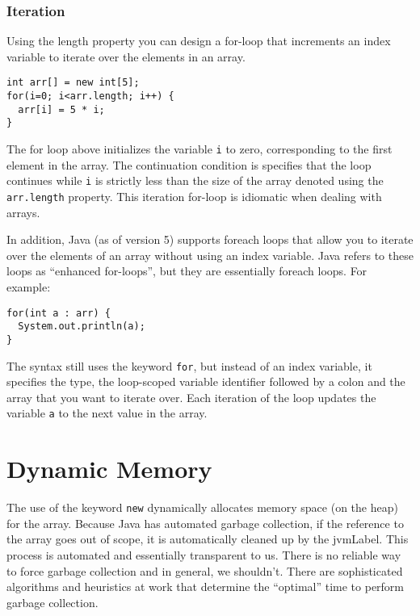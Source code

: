 \subsubsection{Iteration}

Using the length property you can design a for-loop that
increments an index variable to iterate over the elements in
an array.

\begin{verbatim}
int arr[] = new int[5];
for(i=0; i<arr.length; i++) {
  arr[i] = 5 * i;
}
\end{verbatim}

The for loop above initializes the variable \texttt{i} to zero,
corresponding to the first element in the array.  The continuation
condition is specifies that the loop continues while \texttt{i}
is strictly less than the size of the array denoted using the
\texttt{arr.length} property.  This iteration for-loop
is idiomatic when dealing with arrays.

In addition, Java (as of version 5) supports foreach loops that 
allow you to iterate over the elements of an array without using
an index variable.  Java refers to these loops as ``enhanced
for-loops'', but they are essentially foreach loops.  For example:

\begin{verbatim}
for(int a : arr) {
  System.out.println(a);
}
\end{verbatim}

The syntax still uses the keyword \texttt{for}, but instead
of an index variable, it specifies the type, the loop-scoped variable
identifier followed by a colon and the array that you want to iterate
over.  Each iteration of the loop updates the variable \texttt{a}
to the next value in the array.  

\section{Dynamic Memory}

The use of the keyword \texttt{new} dynamically allocates 
memory space (on the heap) for the array.  Because Java has
automated garbage collection, if the reference to the array goes
out of scope, it is automatically cleaned up by the \gls{jvmLabel}.
This process is automated and essentially transparent to us.
There is no reliable way to force garbage collection and in general, 
we shouldn't.  There are sophisticated algorithms and heuristics
at work that determine the ``optimal'' time to perform garbage
collection.

